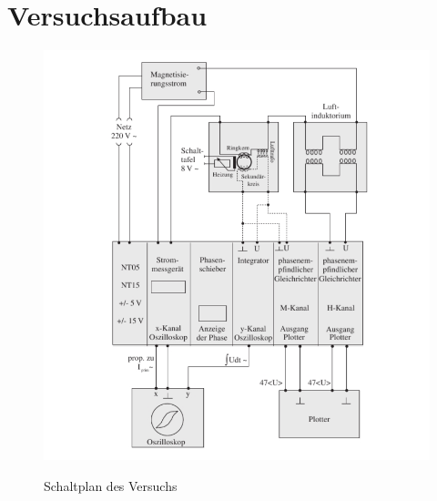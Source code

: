 \section{Versuchsaufbau}

    \begin{figure}[ht]
        \centering
        \includegraphics[width=\textwidth]{Images/Schaltplan.PNG}
        \label{Schaltplan}
        \caption{Schaltplan des Versuchs}
    \end{figure}
